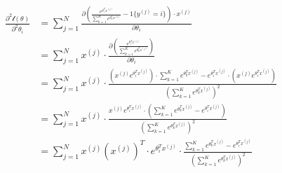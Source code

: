 \documentclass[letterpaper,11pt]{article}
\numberwithin{equation}{section}
\begin{document}
\begin{equation}
    \begin{aligned}
        \frac{\partial^2\mathcal{l}(\theta)}{\partial^2 \theta_i} & = \sum_{j=1}^{N}  \frac{\partial \left(\frac{e^{\theta^T_i  x^{(j)}}}{\sum_{k=1}^{K} e^{\theta^T_k x^{(j)}}} - 1\{y^{(j)}=i\} \right) \cdot x^{(j)} }{\partial \theta_i}                                                                       \\
                                                                  & = \sum_{j=1}^{N} x^{(j)} \cdot \frac{\partial \left( \frac{e^{\theta^T_i  x^{(j)}}}{\sum_{k=1}^{K} e^{\theta^T_k x^{(j)}}} \right) }{\partial \theta_i}                                                                                        \\
                                                                  & = \sum_{j=1}^{N} x^{(j)} \cdot  \frac{(x^{(j)} e^{\theta^T_i  x^{(j)}}) \cdot \sum_{k=1}^{K} e^{\theta^T_k x^{(j)}} - e^{\theta^T_i  x^{(j)}} \cdot (x^{(j)} e^{\theta^T_i  x^{(j)}}) }{\left( \sum_{k=1}^{K} e^{\theta^T_k x^{(j)}}\right)^2} \\
                                                                  & =  \sum_{j=1}^{N} x^{(j)} \cdot  \frac{x^{(j)} e^{\theta^T_i  x^{(j)}} \cdot \left(\sum_{k=1}^{K} e^{\theta^T_k x^{(j)}} - e^{\theta^T_i  x^{(j)}} \right)}{\left( \sum_{k=1}^{K} e^{\theta^T_k x^{(j)}}\right)^2}                             \\
                                                                  & = \sum_{j=1}^{N} x^{(j)} (x^{(j)})^T \cdot  e^{\theta^T_i  x^{(j)}} \cdot \frac{ \sum_{k=1}^{K} e^{\theta^T_k x^{(j)}} - e^{\theta^T_i  x^{(j)}} }{\left( \sum_{k=1}^{K} e^{\theta^T_k x^{(j)}}\right)^2}
    \end{aligned}
\end{equation}
\end{document}
